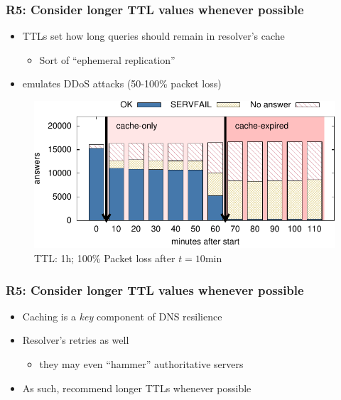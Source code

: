 \documentclass[11pt,show 
notes,notheorems,noamsthm,blank]{beamer} %
\begin{document}
\begin{frame}
 \frametitle{R5: Consider longer TTL values whenever 
possible}
\begin{itemize}
 \item TTLs set how long queries should remain in resolver's cache
\begin{itemize}
   \item Sort of ``ephemeral replication''
\end{itemize}

 \item  \cite{Moura18b}  emulates DDoS attacks (50-100\% packet loss)

 
\end{itemize}


\begin{figure}
\centering
\includegraphics[width=0.7\columnwidth]{fig/hist.pdf}
 \caption{TTL: 1h; 100\%  Packet loss after $t=10$min}
\label{fig:class-valid-queries}
\end{figure}

\end{frame}


\begin{frame}
 \frametitle{R5: Consider longer TTL values whenever 
possible}
\begin{itemize}
 
 
 \item Caching is a \textit{key} component of DNS resilience
 \item Resolver's retries as well 
\begin{itemize}
\item they may even ``hammer'' authoritative servers
\end{itemize}
   
 \item As such, \cite{Moura18b} recommend longer TTLs whenever possible
 
 
 \end{itemize}
 
 
\end{frame}
\end{document}
